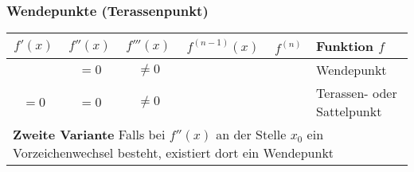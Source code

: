 \subsubsection{Wendepunkte (Terassenpunkt)}
\begin{tabular}{|c|c|c|c|c|l|}
	\hline $f'(x)$ & $f''(x)$ & $f'''(x)$ & $f^{(n-1)}(x)$ & $f^{(n)}$ & Funktion $f$ \\
	\hline\ & $= 0$ & $\neq 0$ & & & Wendepunkt\\
	\hline $= 0$ & $= 0$ & $\neq 0$ & & & Terassen- oder Sattelpunkt\\
	\hline\multicolumn{6}{|l|}{\textbf{Zweite Variante}  Falls bei $f''(x)$ an der Stelle $x_0$ ein Vorzeichenwechsel besteht, existiert dort ein Wendepunkt} \\\hline
\end{tabular}


